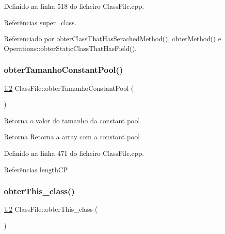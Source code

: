 Definido na linha 518 do ficheiro Class\+File.\+cpp.



Referências super\+\_\+class.



Referenciado por obter\+Class\+That\+Has\+Serached\+Method(), obter\+Method() e Operations\+::obter\+Static\+Class\+That\+Has\+Field().

\mbox{\label{classClassFile_a8b60418144c498b9d9545b1784bddf21}} 
\subsubsection{\texorpdfstring{obter\+Tamanho\+Constant\+Pool()}{obterTamanhoConstantPool()}}
{\footnotesize\ttfamily \hyperlink{BasicTypes_8h_a90240657108b1b457eef9d3f76e0202e}{U2} Class\+File\+::obter\+Tamanho\+Constant\+Pool (\begin{DoxyParamCaption}{ }\end{DoxyParamCaption})}



Retorna o valor do tamanho da constant pool. 

\begin{DoxyReturn}{Retorna}
Retorna a array com a constant pool 
\end{DoxyReturn}


Definido na linha 471 do ficheiro Class\+File.\+cpp.



Referências length\+CP.

\mbox{\label{classClassFile_aec88c5432526d16b546ed59e5cec2136}} 
\subsubsection{\texorpdfstring{obter\+This\+\_\+class()}{obterThis\_class()}}
{\footnotesize\ttfamily \hyperlink{BasicTypes_8h_a90240657108b1b457eef9d3f76e0202e}{U2} Class\+File\+::obter\+This\+\_\+class (\begin{DoxyParamCaption}{ }\end{DoxyParamCaption})}



